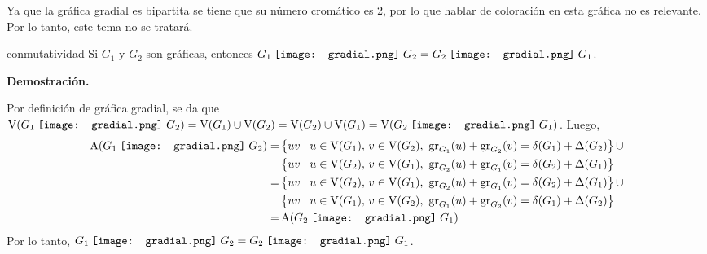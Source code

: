 \documentclass[fleqn, 11pt]{beamer}
\newcommand{\gradial}{\hspace{0.9mm} \texttt{[image: gradial.png]} \hspace{1mm}}
\begin{document}
    Ya que la gráfica gradial es bipartita se tiene que su número cromático es 2, por lo que hablar de coloración en esta gráfica no es relevante. Por lo tanto, este tema no se tratará.

    \begin{proposicion}[breakable, pad at break = 4mm, beforeafter skip = 4mm]{}{conmutatividad}
        Si $ G_1 $ y $ G_2 $ son gráficas, entonces $ G_1 \gradial G_2 = G_2 \gradial G_1 $.
        
        \tcblower

        \textbf{Demostración.} \vspace{3mm}

        Por definición de gráfica gradial, se da que $ \textnormal{V}(G_1 \gradial G_2) = \textnormal{V}(G_1) \cup \textnormal{V}(G_2) = \textnormal{V}(G_2) \cup \textnormal{V}(G_1) = \textnormal{V}(G_2 \gradial G_1) $. Luego,
        \begin{align*}
            \textnormal{A}(G_1 \gradial G_2) =& \, \bigl\{ uv \mid u \in \textnormal{V}(G_1), \, v \in \textnormal{V}(G_2), \textnormal{ gr}_{G_1}(u) + \textnormal{gr}_{G_2}(v) = \delta(G_1) + \Delta(G_2) \bigr\} \, \cup \\
            & \, \bigl\{ uv \mid u \in \textnormal{V}(G_2), \, v \in \textnormal{V}(G_1), \textnormal{ gr}_{G_2}(u) + \textnormal{gr}_{G_1}(v) = \delta(G_2) + \Delta(G_1) \bigr\} \\
            =& \, \bigl\{ uv \mid u \in \textnormal{V}(G_2), \, v \in \textnormal{V}(G_1), \textnormal{ gr}_{G_2}(u) + \textnormal{gr}_{G_1}(v) = \delta(G_2) + \Delta(G_1) \bigr\} \, \cup \\
            & \, \bigl\{ uv \mid u \in \textnormal{V}(G_1), \, v \in \textnormal{V}(G_2), \textnormal{ gr}_{G_1}(u) + \textnormal{gr}_{G_2}(v) = \delta(G_1) + \Delta(G_2) \bigr\} \\
            =& \, \textnormal{A}(G_2 \gradial G_1)
        \end{align*}
        Por lo tanto, $ G_1 \gradial G_2 = G_2 \gradial G_1 $.
    \end{proposicion}
\end{document}
